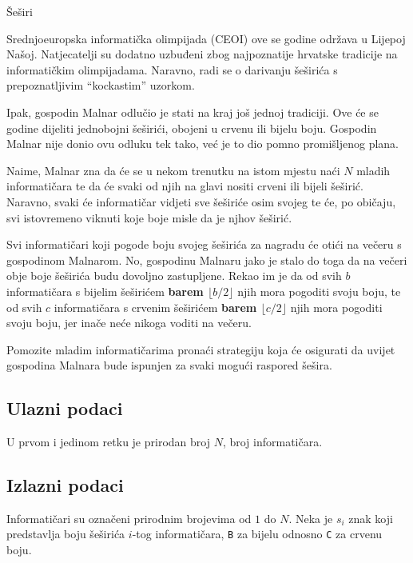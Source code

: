 \begin{statement}[
  problempoints=100,
  timelimit=1 sekunda,
  memorylimit=512 MiB,
]{Šeširi}

Srednjoeuropska informatička olimpijada (CEOI) ove se godine održava u Lijepoj
Našoj. Natjecatelji su dodatno uzbuđeni zbog najpoznatije hrvatske tradicije na
informatičkim olimpijadama. Naravno, radi se o darivanju šeširića s
prepoznatljivim ``kockastim'' uzorkom.

Ipak, gospodin Malnar odlučio je stati na kraj još jednoj tradiciji. Ove će se
godine dijeliti jednobojni šeširići, obojeni u crvenu ili bijelu boju. Gospodin
Malnar nije donio ovu odluku tek tako, već je to dio pomno promišljenog plana.

Naime, Malnar zna da će se u nekom trenutku na istom mjestu naći $N$ mladih
informatičara te da će svaki od njih na glavi nositi crveni ili bijeli
šeširić.  Naravno, svaki će informatičar vidjeti sve šeširiće osim svojeg te
će, po običaju, svi istovremeno viknuti koje boje misle da je njhov šeširić.

Svi informatičari koji pogode boju svojeg šeširića za nagradu će otići na večeru
s gospodinom Malnarom. No, gospodinu
Malnaru jako je stalo do toga da na večeri obje boje šeširića budu dovoljno
zastupljene. Rekao im je da od svih $b$ informatičara s bijelim
šeširićem \textbf{barem $\lfloor b/2 \rfloor$} njih mora pogoditi svoju boju, te od svih
$c$ informatičara s crvenim šeširićem \textbf{barem $\lfloor c/2 \rfloor$} njih mora
pogoditi svoju boju, jer inače neće nikoga voditi na večeru.

Pomozite mladim informatičarima pronaći strategiju koja će osigurati da uvijet
gospodina Malnara bude ispunjen za svaki mogući raspored šešira.

\subsection*{Ulazni podaci}
U prvom i jedinom retku je prirodan broj $N$, broj informatičara.

\subsection*{Izlazni podaci}

Informatičari su označeni prirodnim brojevima od $1$ do $N$.
Neka je $s_i$ znak koji predstavlja boju šeširića $i$-tog informatičara, \texttt{B}
za bijelu odnosno \texttt{C} za crvenu boju.


\end{statement}
